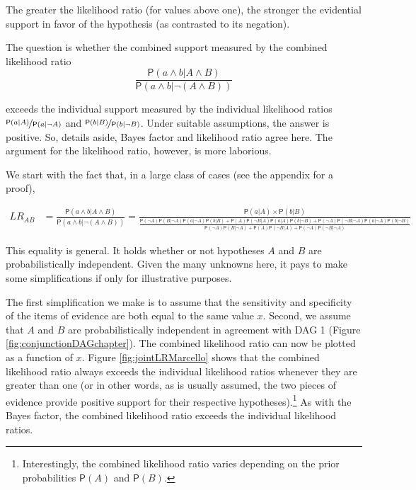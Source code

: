 \documentclass[
  10pt,
  dvipsnames,enabledeprecatedfontcommands]{scrartcl}
\newcommand{\pr}[1]{\ensuremath{\mathsf{P}(#1)}}
\begin{document}
\noindent The greater the likelihood ratio (for values above one), the
stronger the evidential support in favor of the hypothesis (as
contrasted to its negation).

The question is whether the combined support measured by the combined
likelihood ratio
\[\frac{\pr{a\wedge b \vert A\wedge B}}{\pr{a \wedge b \vert \neg (A\wedge B)}}\]

\noindent exceeds the individual support measured by the individual
likelihood ratios \(\nicefrac{\pr{a \vert A}}{\pr{a \vert \neg A}}\) and
\(\nicefrac{\pr{b \vert B}}{\pr{b \vert \neg B}}\). Under suitable
assumptions, the answer is positive. So, details aside, Bayes factor and
likelihood ratio agree here. The argument for the likelihood ratio,
however, is more laborious.

We start with the fact that, in a large class of cases (see the appendix
for a proof),

\begin{align*}
LR_{AB} & = \frac{\pr{a\wedge b \vert A\wedge B}}{\pr{a \wedge b \vert \neg (A\wedge B)}} = \frac{\pr{a \vert A} \times \pr{b \vert B}}
 {\frac{\pr{\neg A}\pr{B \vert \neg A} \pr{a \vert \neg A}\pr{b \vert B} + \pr{A}\pr{\neg B \vert A} \pr{a \vert A }\pr{b \vert \neg B} + \pr{\neg A}\pr{\neg B \vert \neg A } \pr{a \vert \neg A}\pr{b \vert \neg B}}{\pr{\neg A}\pr{B \vert \neg A} + \pr{A}\pr{\neg B \vert A } + \pr{\neg A}\pr{\neg B \vert \neg A} }}
\end{align*}

\noindent This equality is general. It holds whether or not hypotheses
\(A\) and \(B\) are probabilistically independent. Given the many
unknowns here, it pays to make some simplifications if only for
illustrative purposes.

The first simplification we make is to assume that the sensitivity and
specificity of the items of evidence are both equal to the same value
\(x\). Second, we assume that \(A\) and \(B\) are probabilistically
independent in agreement with \textsf{DAG 1} (Figure
\ref{fig:conjunctionDAGchapter}). The combined likelihood ratio can now
be plotted as a function of \(x\). Figure \ref{fig:jointLRMarcello}
shows that the combined likelihood ratio always exceeds the individual
likelihood ratios whenever they are greater than one (or in other words,
as is usually assumed, the two pieces of evidence provide positive
support for their respective hypotheses).\footnote{Interestingly, the
  combined likelihood ratio varies depending on the prior probabilities
  \(\pr{A}\) and \(\pr{B}\).} As with the Bayes factor, the combined
likelihood ratio exceeds the individual likelihood ratios.
\end{document}
